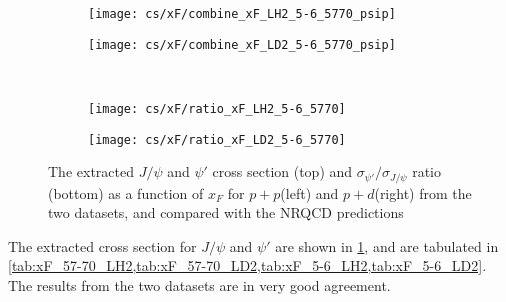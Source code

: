 \documentclass[../main.tex]{subfiles}
\begin{document}
\begin{figure}[h!]
	\centering
	\begin{subfigure}{0.45\linewidth}
		\texttt{[image: cs/xF/combine\_xF\_LH2\_5-6\_5770\_psip]}
	\end{subfigure}
	\centering
	\begin{subfigure}{0.45\linewidth}
		\texttt{[image: cs/xF/combine\_xF\_LD2\_5-6\_5770\_psip]}
	\end{subfigure}
	\\
	\begin{subfigure}{0.45\linewidth}
		\texttt{[image: cs/xF/ratio\_xF\_LH2\_5-6\_5770]}
	\end{subfigure}
	\begin{subfigure}{0.45\linewidth}
		\texttt{[image: cs/xF/ratio\_xF\_LD2\_5-6\_5770]}
	\end{subfigure}
	\caption{The extracted $J/\psi$ and $\psi'$ cross section (top) and $\sigma_{\psi'}/\sigma_{J/\psi}$
		ratio (bottom) as a function of $x_F$ for $p+p$(left) and $p+d$(right) from the two datasets,
		and compared with the NRQCD predictions}
	\label{fig:cs_xF}
\end{figure}

The extracted cross section for $J/\psi$ and $\psi'$ are shown in \cref{fig:cs_xF}, and are
tabulated in \cref{tab:xF_57-70_LH2,tab:xF_57-70_LD2,tab:xF_5-6_LH2,tab:xF_5-6_LD2}.
The results from the two datasets are in very good agreement.

\begin{table}[h!]
	\centering
	\caption{Cross section as a function of $x_F$ (in \unit{\nano\barn\per nucleon}) and the
		$\sigma_{\psi'}/\sigma_{J/\psi}$ ratio for $p+p$ extracted from run 2-3, with their statistical
		and systematic uncertainties and the average $x_F$ in each bin.}
	
	\label{tab:xF_57-70_LH2}
\end{table}
\begin{table}[h!]
	\centering
	\caption{Cross section as a function of $x_F$ (in \unit{\nano\barn\per nucleon}) and the
		$\sigma_{\psi'}/\sigma_{J/\psi}$ ratio for $p+d$ extracted from run 2-3, with their statistical
		and systematic uncertainties and the average $x_F$ in each bin.}
	
	\label{tab:xF_57-70_LD2}
\end{table}
\begin{table}[h!]
	\centering
	\caption{Cross section as a function of $x_F$ (in \unit{\nano\barn\per nucleon}) and the
		$\sigma_{\psi'}/\sigma_{J/\psi}$ ratio for $p+p$ extracted from run 5-6, with their statistical
		and systematic uncertainties and the average $x_F$ in each bin.}
	
	\label{tab:xF_5-6_LH2}
\end{table}
\begin{table}[h!]
	\centering
	\caption{Cross section as a function of $x_F$ (in \unit{\nano\barn\per nucleon}) and the
		$\sigma_{\psi'}/\sigma_{J/\psi}$ ratio for $p+d$ extracted from run 5-6, with their statistical
		and systematic uncertainties and the average $x_F$ in each bin.}
	
	\label{tab:xF_5-6_LD2}
\end{table}
\FloatBarrier
\end{document}
